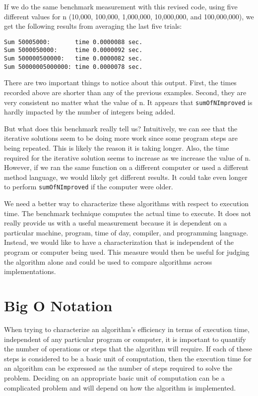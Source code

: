 If we do the same benchmark measurement with this revised code, using five different values for n (10,000, 100,000, 1,000,000, 10,000,000, and 100,000,000), we get the following results from averaging the last five trials:
\begin{verbatim}
Sum 50005000:       time 0.0000088 sec.
Sum 5000050000:     time 0.0000092 sec.
Sum 500000500000:   time 0.0000082 sec.
Sum 50000005000000: time 0.0000078 sec.
\end{verbatim}

There are two important things to notice about this output. First, the times recorded above are shorter than any of the previous examples. Second, they are very consistent no matter what the value of n. It appears that \texttt{sumOfNImproved} is hardly impacted by the number of integers being added.


But what does this benchmark really tell us? Intuitively, we can see that the iterative solutions seem to be doing more work since some program steps are being repeated. This is likely the reason it is taking longer. Also, the time required for the iterative solution seems to increase as we increase the value of n. However, if we ran the same function on a different computer or used a different method language, we would likely get different results. It could take even longer to perform \texttt{sumOfNImproved} if the computer were older.

We need a better way to characterize these algorithms with respect to execution time. The benchmark technique computes the actual time to execute. It does not really provide us with a useful measurement because it is dependent on a particular machine, program, time of day, compiler, and programming language. Instead, we would like to have a characterization that is independent of the program or computer being used. This measure would then be useful for judging the algorithm alone and could be used to compare algorithms across implementations.



\section{Big O Notation}
When trying to characterize an algorithm’s efficiency in terms of execution time, independent of any particular program or computer, it is important to quantify the number of operations or steps that the algorithm will require. If each of these steps is considered to be a basic unit of computation, then the execution time for an algorithm can be expressed as the number of steps required to solve the problem. Deciding on an appropriate basic unit of computation can be a complicated problem and will depend on how the algorithm is implemented.

